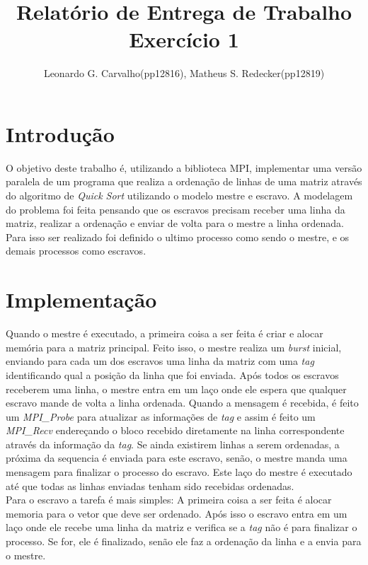 \documentclass[12pt]{article}
\title{Relatório de Entrega de Trabalho \\
       Exercício 1}
\author{Leonardo G. Carvalho(pp12816), Matheus S. Redecker(pp12819)}
\begin{document}
 

\maketitle

{\footnotesize
\begin{multicols}{2}
\section{Introdução}
O objetivo deste trabalho é, utilizando a biblioteca MPI, implementar uma versão paralela de um programa que realiza a ordenação de linhas de uma matriz através do algoritmo de \textit{Quick Sort} utilizando o modelo mestre e escravo. A modelagem do problema foi feita pensando que os escravos precisam receber uma linha da matriz, realizar a ordenação e enviar de volta para o mestre a linha ordenada. Para isso ser realizado foi definido o ultimo processo como sendo o mestre, e os demais processos como escravos. 

\section{Implementação}
Quando o mestre é executado, a primeira coisa a ser feita é criar e alocar memória para a matriz principal. Feito isso, o mestre realiza um \textit{burst} inicial, enviando para cada um dos escravos uma linha da matriz com uma \textit{tag} identificando qual a posição da linha que foi enviada. Após todos os escravos receberem uma linha, o mestre entra em um laço onde ele espera que qualquer escravo mande de volta a linha ordenada. Quando a mensagem é recebida, é feito um \textit{MPI\_Probe} para atualizar as informações de \textit{tag} e assim é feito um \textit{MPI\_Recv} endereçando o bloco recebido diretamente na linha correspondente através da informação da \textit{tag}. Se ainda existirem linhas a serem ordenadas, a próxima da sequencia é enviada para este escravo, senão, o mestre manda uma mensagem para finalizar o processo do escravo. Este laço do mestre é executado até que todas as linhas enviadas tenham sido recebidas ordenadas.\\Para o escravo a tarefa é mais simples: A primeira coisa a ser feita é alocar memoria para o vetor que deve ser ordenado. Após isso o escravo entra em um laço onde ele recebe uma linha da matriz e verifica se a \textit{tag} não é para finalizar o processo. Se for, ele é finalizado, senão ele faz a ordenação da linha e a envia para o mestre.


\end{multicols}}
\end{document}
